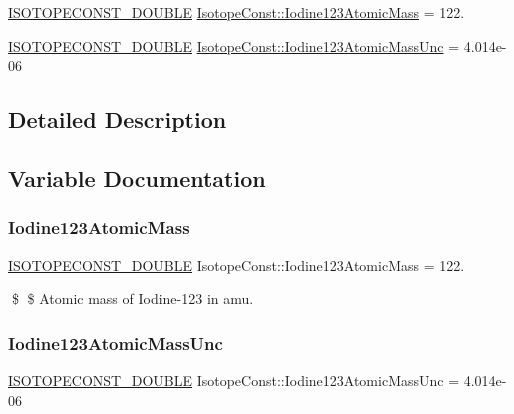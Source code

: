 \begin{DoxyCompactItemize}
\item 
\mbox{\hyperlink{group___isotope_const-_macros_ga8f45a7272ce02c0b4c65c44636ed719a}{I\+S\+O\+T\+O\+P\+E\+C\+O\+N\+S\+T\+\_\+\+D\+O\+U\+B\+LE}} \mbox{\hyperlink{group___isotope_const-_iodine-_i123_gac61ef7e702299e2b142aa218b66db6ec}{Isotope\+Const\+::\+Iodine123\+Atomic\+Mass}} = 122.
\item 
\mbox{\hyperlink{group___isotope_const-_macros_ga8f45a7272ce02c0b4c65c44636ed719a}{I\+S\+O\+T\+O\+P\+E\+C\+O\+N\+S\+T\+\_\+\+D\+O\+U\+B\+LE}} \mbox{\hyperlink{group___isotope_const-_iodine-_i123_ga26aaf22f8d42bb817b0f6ef03cb837cb}{Isotope\+Const\+::\+Iodine123\+Atomic\+Mass\+Unc}} = 4.\+014e-\/06
\end{DoxyCompactItemize}


\subsection{Detailed Description}


\subsection{Variable Documentation}
\mbox{\label{group___isotope_const-_iodine-_i123_gac61ef7e702299e2b142aa218b66db6ec}} 
\subsubsection{\texorpdfstring{Iodine123\+Atomic\+Mass}{Iodine123AtomicMass}}
{\footnotesize\ttfamily \mbox{\hyperlink{group___isotope_const-_macros_ga8f45a7272ce02c0b4c65c44636ed719a}{I\+S\+O\+T\+O\+P\+E\+C\+O\+N\+S\+T\+\_\+\+D\+O\+U\+B\+LE}} Isotope\+Const\+::\+Iodine123\+Atomic\+Mass = 122.}

\$ \$ Atomic mass of Iodine-\/123 in amu. \mbox{\label{group___isotope_const-_iodine-_i123_ga26aaf22f8d42bb817b0f6ef03cb837cb}} 
\subsubsection{\texorpdfstring{Iodine123\+Atomic\+Mass\+Unc}{Iodine123AtomicMassUnc}}
{\footnotesize\ttfamily \mbox{\hyperlink{group___isotope_const-_macros_ga8f45a7272ce02c0b4c65c44636ed719a}{I\+S\+O\+T\+O\+P\+E\+C\+O\+N\+S\+T\+\_\+\+D\+O\+U\+B\+LE}} Isotope\+Const\+::\+Iodine123\+Atomic\+Mass\+Unc = 4.\+014e-\/06}

